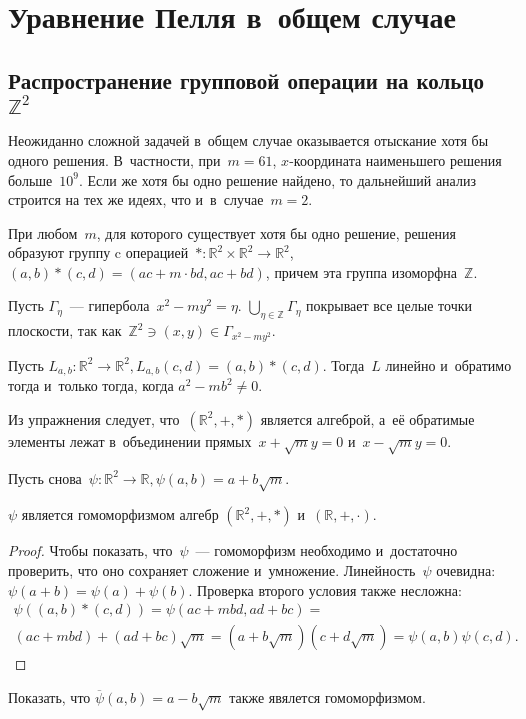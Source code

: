\documentclass{article}
\begin{document}
\section{Уравнение Пелля в~общем случае}

\subsection{Распространение групповой операции на кольцо~$\mathbb{Z}^2$}

Неожиданно сложной задачей в~общем случае оказывается отыскание хотя бы одного
решения. В~частности, при~$m = 61$, $x$-координата наименьшего решения
больше~$10^9$. Если же хотя бы одно решение найдено, то дальнейший анализ
строится на тех же идеях, что и~в~случае~$m = 2$.

\begin{theorem}
  При любом~$m$, для которого существует хотя бы одно решение, решения образуют
  группу c операцией~$\ast\colon \mathbb{R}^2 \times \mathbb{R}^2
  \rightarrow \mathbb{R}^2$, $(a, b) \ast (c, d) = (ac + m\cdot bd, ac + bd)$,
  причем эта группа изоморфна~$\mathbb{Z}$.
\end{theorem}

Пусть $\Gamma_{\eta}$~--- гипербола~$x^2 - my^2 = \eta$.
$\bigcup\limits_{\eta \in \mathbb{Z}} \Gamma_\eta$ покрывает все целые точки
плоскости, так как~$\mathbb{Z}^2 \ni (x, y) \in \Gamma_{x^2 - my^2}$.

\begin{exercise}
  Пусть $L_{a,b}\colon\mathbb{R}^2\rightarrow\mathbb{R}^2,
  L_{a,b}(c, d) = (a, b) \ast(c, d)$. Тогда~$L$ линейно и~обратимо тогда
  и~только тогда, когда $a^2 - mb^2 \ne 0$.
\end{exercise}

Из упражнения следует, что~$(\mathbb{R}^2, +, \ast)$ является алгеброй,
а~её обратимые элементы лежат в~объединении прямых~$x + \sqrt{m}y = 0$
и~$x - \sqrt{m}y = 0$.

Пусть снова~$\psi\colon \mathbb{R}^2 \rightarrow \mathbb{R},
\psi(a, b) = a + b\sqrt{m}$.

\begin{claim}
  $\psi$ является гомоморфизмом алгебр $(\mathbb{R}^2, +, \ast)$
  и~$(\mathbb{R}, +, \cdot)$.
\end{claim}
\begin{proof}
  Чтобы показать, что~$\psi$~--- гомоморфизм необходимо и~достаточно проверить,
  что оно сохраняет сложение и~умножение. Линейность~$\psi$ очевидна:
  $\psi(a + b) = \psi(a) + \psi(b)$. Проверка второго условия также несложна:
  \begin{multline*}
    \psi( (a, b) \ast (c, d) ) = \psi(ac + mbd, ad + bc) = \\
    (ac + mbd) + (ad + bc)\sqrt{m} = (a + b\sqrt{m})(c + d\sqrt{m})
    = \psi(a, b)\psi(c, d).
  \end{multline*}
\end{proof}
\begin{exercise}
  Показать, что $\overline\psi(a, b) = a - b\sqrt{m}$ также явялется
  гомоморфизмом.
\end{exercise}
\end{document}
